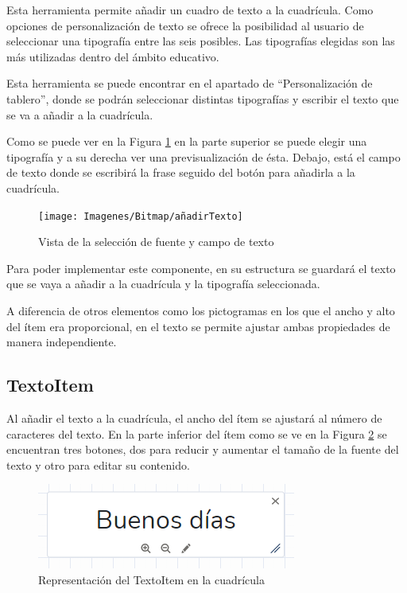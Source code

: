 Esta herramienta permite añadir un cuadro de texto a la cuadrícula. Como opciones de personalización de texto se ofrece la posibilidad al usuario de seleccionar una tipografía entre las seis posibles. Las tipografías elegidas son las más utilizadas dentro del ámbito educativo.

Esta herramienta se puede encontrar en el apartado de “Personalización de tablero”, donde se podrán seleccionar distintas tipografías y escribir el texto que se va a añadir a la cuadrícula.

Como se puede ver en la Figura \ref{fig:anadirtexto} en la parte superior se puede elegir una tipografía y a su derecha ver una previsualización de ésta. Debajo, está el campo de texto donde se escribirá la frase seguido del botón para añadirla a la cuadrícula.

\begin{figure}[h!]
	\centering
	\texttt{[image: Imagenes/Bitmap/añadirTexto]}
	\caption{Vista de la selección de fuente y campo de texto}
	\label{fig:anadirtexto}
\end{figure}


Para poder implementar este componente, en su estructura se guardará el texto que se vaya a añadir a la cuadrícula y la tipografía seleccionada.

A diferencia de otros elementos como los pictogramas en los que el ancho y alto del ítem era proporcional, en el texto se permite ajustar ambas propiedades de manera independiente.

\subsection{TextoItem}

Al añadir el texto a la cuadrícula, el ancho del ítem se ajustará al número de caracteres del texto. En la parte inferior del ítem como se ve en la Figura \ref{fig:fraseitem1} se encuentran tres botones, dos para reducir y aumentar el tamaño de la fuente del texto y otro para editar su contenido.

\begin{figure}[h!]
	\centering
	\includegraphics[width=0.7\linewidth]{Imagenes/Bitmap/fraseItem1}
	\caption{Representación del TextoItem en la cuadrícula}
	\label{fig:fraseitem1}
\end{figure}


